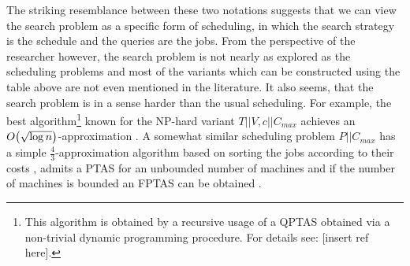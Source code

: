 The striking resemblance between these two notations suggests that we can view the search problem as a specific form of scheduling, in which the search strategy is the schedule and the queries are the jobs. From the perspective of the researcher however, the search problem is not nearly as explored as the scheduling problems and most of the variants which can be constructed using the table above are not even mentioned in the literature. It also seems, that the search problem is in a sense harder than the usual scheduling. For example, the best algorithm\footnote{This algorithm is obtained by a recursive usage of a QPTAS obtained via a non-trivial dynamic programming procedure. For details see: [insert ref here].} known for the NP-hard variant $T||V, c||C_{max}$ achieves an $O\mathopen{}\left( \sqrt{\log n} \right)$-approximation \cite{dereniowski2017ApproxSsForGeneralBSinWTs}. A somewhat similar scheduling problem $P||C_{max}$ has a simple $\frac{4}{3}$-approximation algorithm based on sorting the jobs according to their costs \cite{BoundsonMultiprocessingTimingAnomalies}, admits a PTAS for an unbounded number of machines \cite{Binpackingwithrestrictedpiecesizes} and if the number of machines is bounded an FPTAS can be obtained \cite{AlgorithmsforSchedulingIndependentTasks}.
